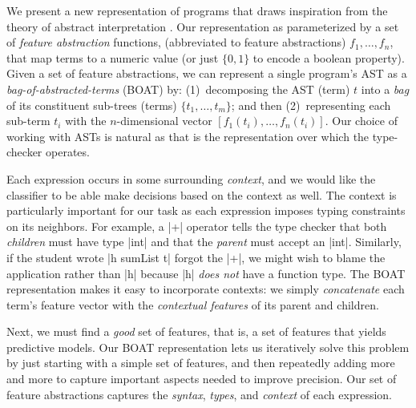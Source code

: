 %
We present a new representation of programs
that draws inspiration from the theory of
abstract interpretation \citep{CousotCousot77}.
%
Our representation as parameterized by a
set of \emph{feature abstraction} functions,
(abbreviated to feature abstractions)
$f_1, \ldots, f_n$, that map terms to a
numeric value (or just $\{0, 1\}$ to
encode a boolean property).
%
Given a set of feature abstractions, we
can represent a single program's AST as
a \emph{bag-of-abstracted-terms} (BOAT)
by:
%
(1)~decomposing the AST (term) $t$ into
    a \emph{bag} of its constituent sub-trees
    (terms) $\{t_1,\ldots,t_m\}$; and then
%
(2)~representing each sub-term $t_i$
    with the $n$-dimensional
    vector $[f_1(t_i),\ldots, f_n(t_i)]$.
%
Our choice of working with ASTs is natural
as that is the representation over which the
type-checker operates.



%
Each expression occurs in some surrounding
\emph{context}, and we would like the
classifier to be able make decisions based
on the context as well.
%
The context is particularly important
for our task as each expression
imposes typing constraints on its
neighbors.
%
For example, a |+| operator tells
the type checker that both \emph{children}
must have type |int| and that the \emph{parent}
must accept an |int|.
%
Similarly, if the student wrote
|h sumList t| \ie forgot the |+|,
we might wish to blame the application
rather than |h| because |h|
\emph{does not} have a function type.
%
The BOAT representation makes it
easy to incorporate contexts: we
simply \emph{concatenate} each
term's feature vector with the
\emph{contextual features} of
its parent and children.




Next, we must find a \emph{good}
set of features, that is, a set
of features that yields predictive
models. Our BOAT representation
lets us iteratively solve this
problem by just starting with
a simple set of features, and
then repeatedly adding more
and more to capture important
aspects needed to improve precision.
%
Our set of feature abstractions
captures the
\emph{syntax}, \emph{types}, and
\emph{context} of each expression.

